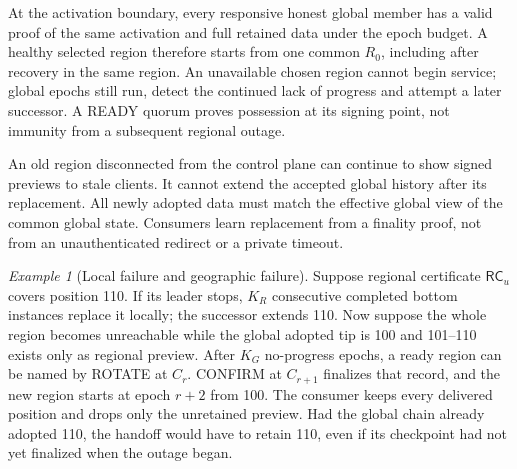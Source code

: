 \documentclass[11pt,a4paper,onecolumn]{article}
\newcommand{\RC}{\mathsf{RC}}
\theoremstyle{remark}\newtheorem{example}[definition]{Example}
\begin{document}
At the activation boundary, every responsive honest global member has a valid
proof of the same activation and full retained data under the epoch budget. A healthy selected
region therefore starts from one common $R_0$, including after recovery in the
same region. An unavailable chosen region
cannot begin service; global epochs still run, detect the continued lack of
progress and attempt a later successor. A READY quorum proves possession at
its signing point, not immunity from a subsequent regional outage.

An old region disconnected from the control plane can continue to show signed
previews to stale clients. It cannot extend the accepted global history after
its replacement. All newly adopted data must match the effective global view
of the common global state. Consumers learn replacement from a finality proof,
not from an unauthenticated redirect or a private timeout.

\begin{example}[Local failure and geographic failure]
Suppose regional certificate $\RC_u$ covers position 110. If its leader stops,
$K_R$ consecutive completed bottom instances replace it locally; the successor
extends 110. Now suppose the whole region becomes unreachable while the global
adopted tip is 100 and 101--110 exists only as regional preview. After $K_G$
no-progress epochs, a ready region can be named by ROTATE at $C_r$. CONFIRM at
$C_{r+1}$ finalizes that record, and the new region starts at epoch $r+2$ from
100. The consumer keeps every delivered position and drops only the unretained
preview. Had the global chain already adopted 110, the handoff would have to
retain 110, even if its checkpoint had not yet finalized when the outage began.
\end{example}

\end{document}
